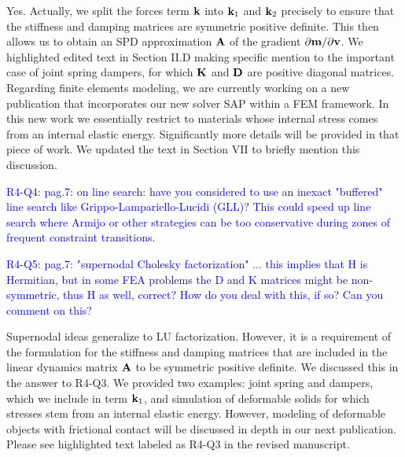 Yes. Actually, we split the forces term ${\mathbf{k}}$ into ${\mathbf{k}}_1$ and ${\mathbf{k}}_2$
precisely to ensure that the stiffness and damping matrices are symmetric
positive definite. This then allows us to obtain an SPD approximation ${\mathbf{A}}$ of
the gradient $\partial {\mathbf{m}}/\partial {\mathbf{v}}$. We highlighted edited text in
Section II.D making specific mention to the important case of joint spring
dampers, for which ${\mathbf{K}}$ and ${\mathbf{D}}$ are positive diagonal matrices.
Regarding finite elements modeling, we are currently working on a new
publication that incorporates our new solver SAP within a FEM framework. In this
new work we essentially restrict to materials whose internal stress comes from
an internal elastic energy. Significantly more details will be provided in that
piece of work. We updated the text in Section VII to briefly mention this
discussion.


\vspace{5mm}

\textcolor{blue}{R4-Q4: pag.7: on line search: have you considered to use an
inexact "buffered" line search like Grippo-Lampariello-Lucidi (GLL)? This could
speed up line search where Armijo or other strategies can be too conservative
during zones of frequent constraint transitions.}


\vspace{5mm}

\textcolor{blue}{R4-Q5: pag.7: "supernodal Cholesky factorization" ... this
implies that H is Hermitian, but in some FEA problems the D and K matrices might
be non-symmetric, thus H as well, correct? How do you deal with this, if so? Can
you comment on this? }

Supernodal ideas generalize to LU factorization. However, it is a requirement of
the formulation for the stiffness and damping matrices that are included in the
linear dynamics matrix ${\mathbf{A}}$ to be symmetric positive definite. We discussed
this in the answer to R4-Q3. We provided two examples: joint spring and dampers,
which we include in term ${\mathbf{k}}_1$, and simulation of deformable solids for
which stresses stem from an internal elastic energy. However, modeling
of deformable objects with frictional contact will be discussed in depth in our
next publication. Please see highlighted text labeled as R4-Q3 in the revised
manuscript.

